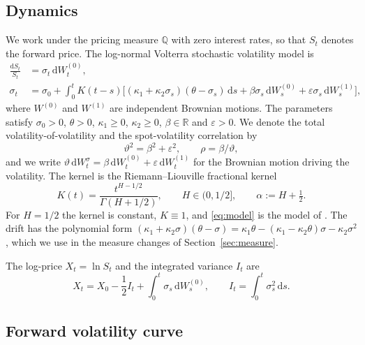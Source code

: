 \documentclass[11pt,a4paper]{article}
\theoremstyle{definition}
\newcommand{\D}{\mathrm{d}}
\newcommand{\Q}{\mathbb{Q}}
\begin{document}
\subsection{Dynamics}

We work under the pricing measure $\Q$ with zero interest rates, so that $S_t$ denotes the forward price. The log-normal Volterra stochastic volatility model is
\begin{equation}\label{eq:model}
\begin{split}
\frac{\D S_t}{S_t} &= \sigma_t\,\D W^{(0)}_t,\\
\sigma_t &= \sigma_0+\int_0^t K(t-s)\Big[(\kappa_1+\kappa_2\sigma_s)(\theta-\sigma_s)\,\D s+\beta\sigma_s\,\D W^{(0)}_s+\varepsilon\sigma_s\,\D W^{(1)}_s\Big],
\end{split}
\end{equation}
where $W^{(0)}$ and $W^{(1)}$ are independent Brownian motions. The parameters satisfy $\sigma_0>0$, $\theta>0$, $\kappa_1\ge0$, $\kappa_2\ge0$, $\beta\in\mathbb{R}$ and $\varepsilon>0$. We denote the total volatility-of-volatility and the spot-volatility correlation by
\begin{equation}\label{eq:vartheta}
\vartheta^2=\beta^2+\varepsilon^2,\qquad \rho=\beta/\vartheta,
\end{equation}
and we write $\vartheta\,\D W^{\sigma}_t=\beta\,\D W^{(0)}_t+\varepsilon\,\D W^{(1)}_t$ for the Brownian motion driving the volatility. The kernel is the Riemann--Liouville fractional kernel
\begin{equation}\label{eq:kernel}
K(t)=\frac{t^{H-1/2}}{\Gamma(H+1/2)},\qquad H\in(0,1/2],\qquad \alpha:=H+\tfrac12 .
\end{equation}
For $H=1/2$ the kernel is constant, $K\equiv1$, and \eqref{eq:model} is the model of \citet{SeppRakhmonov2023}. The drift has the polynomial form $(\kappa_1+\kappa_2\sigma)(\theta-\sigma)=\kappa_1\theta-(\kappa_1-\kappa_2\theta)\sigma-\kappa_2\sigma^2$, which we use in the measure changes of Section~\ref{sec:measure}.

The log-price $X_t=\ln S_t$ and the integrated variance $I_t$ are
\begin{equation}\label{eq:logprice}
X_t=X_0-\frac12 I_t+\int_0^t\sigma_s\,\D W^{(0)}_s,\qquad I_t=\int_0^t\sigma_s^2\,\D s .
\end{equation}


\subsection{Forward volatility curve}
\end{document}
